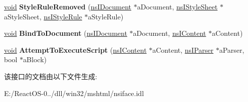 \begin{DoxyCompactItemize}
\hyperlink{interfacevoid}{void} {\bfseries Style\+Rule\+Removed} (\hyperlink{interfacens_i_document}{ns\+I\+Document} $\ast$a\+Document, \hyperlink{interfacens_i_supports}{ns\+I\+Style\+Sheet} $\ast$a\+Style\+Sheet, \hyperlink{interfacens_i_supports}{ns\+I\+Style\+Rule} $\ast$a\+Style\+Rule)
\item 
\mbox{\label{interfacens_i_document_observer_aa305aa0b5dab23c3147aa11d396f9b63}} 
\hyperlink{interfacevoid}{void} {\bfseries Bind\+To\+Document} (\hyperlink{interfacens_i_document}{ns\+I\+Document} $\ast$a\+Document, \hyperlink{interfacens_i_content}{ns\+I\+Content} $\ast$a\+Content)
\item 
\mbox{\label{interfacens_i_document_observer_afb86bba2f557f5b53473a84f99621ad7}} 
\hyperlink{interfacevoid}{void} {\bfseries Attempt\+To\+Execute\+Script} (\hyperlink{interfacens_i_content}{ns\+I\+Content} $\ast$a\+Content, \hyperlink{interfacens_i_parser}{ns\+I\+Parser} $\ast$a\+Parser, bool $\ast$a\+Block)
\end{DoxyCompactItemize}


该接口的文档由以下文件生成\+:\begin{DoxyCompactItemize}
\item 
E\+:/\+React\+O\+S-\/0../dll/win32/mshtml/nsiface.\+idl\end{DoxyCompactItemize}
